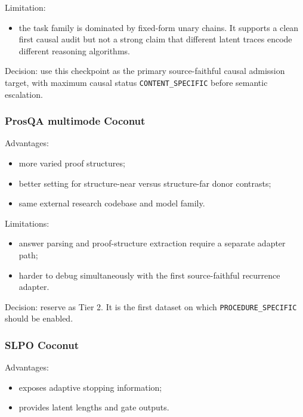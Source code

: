 \documentclass[
  10pt,
]{article}
\providecommand{\tightlist}{%
  \setlength{\itemsep}{0pt}\setlength{\parskip}{0pt}}
\begin{document}
Limitation:

\begin{itemize}
\tightlist
\item
  the task family is dominated by fixed-form unary chains. It supports a
  clean first causal audit but not a strong claim that different latent
  traces encode different reasoning algorithms.
\end{itemize}

Decision: use this checkpoint as the primary source-faithful causal
admission target, with maximum causal status \texttt{CONTENT\_SPECIFIC}
before semantic escalation.

\subsubsection{ProsQA multimode Coconut}\label{prosqa-multimode-coconut}

Advantages:

\begin{itemize}
\tightlist
\item
  more varied proof structures;
\item
  better setting for structure-near versus structure-far donor
  contrasts;
\item
  same external research codebase and model family.
\end{itemize}

Limitations:

\begin{itemize}
\tightlist
\item
  answer parsing and proof-structure extraction require a separate
  adapter path;
\item
  harder to debug simultaneously with the first source-faithful
  recurrence adapter.
\end{itemize}

Decision: reserve as Tier 2. It is the first dataset on which
\texttt{PROCEDURE\_SPECIFIC} should be enabled.

\subsubsection{SLPO Coconut}\label{slpo-coconut}

Advantages:

\begin{itemize}
\tightlist
\item
  exposes adaptive stopping information;
\item
  provides latent lengths and gate outputs.
\end{itemize}
\end{document}
